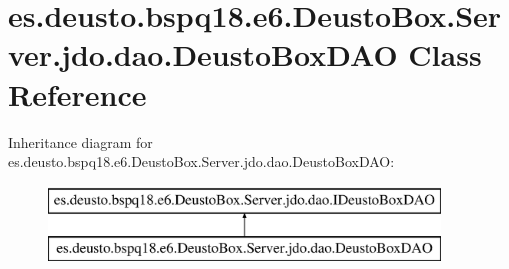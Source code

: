 \hypertarget{classes_1_1deusto_1_1bspq18_1_1e6_1_1_deusto_box_1_1_server_1_1jdo_1_1dao_1_1_deusto_box_d_a_o}{}\section{es.\+deusto.\+bspq18.\+e6.\+Deusto\+Box.\+Server.\+jdo.\+dao.\+Deusto\+Box\+D\+AO Class Reference}
\label{classes_1_1deusto_1_1bspq18_1_1e6_1_1_deusto_box_1_1_server_1_1jdo_1_1dao_1_1_deusto_box_d_a_o}
Inheritance diagram for es.\+deusto.\+bspq18.\+e6.\+Deusto\+Box.\+Server.\+jdo.\+dao.\+Deusto\+Box\+D\+AO\+:\begin{figure}[H]
\begin{center}
\leavevmode
\includegraphics[height=2.000000cm]{classes_1_1deusto_1_1bspq18_1_1e6_1_1_deusto_box_1_1_server_1_1jdo_1_1dao_1_1_deusto_box_d_a_o}
\end{center}
\end{figure}
